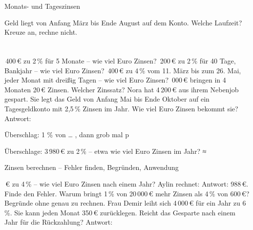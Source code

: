 \begin{aufgabe}{Monats- und Tageszinsen}
\begin{teile}
\teil Geld liegt von Anfang März bis Ende August auf dem Konto. Welche Laufzeit? Kreuze an, rechne nicht. \\  \\  \\ 
\,400\,€ zu 2\,\% für 5 Monate – wie viel Euro Zinsen? \leerfeld[€]
\,200\,€ zu 2\,\% für 40 Tage, Bankjahr – wie viel Euro Zinsen? \leerfeld[€]
\,400\,€ zu 4\,\% vom 11. März bis zum 26. Mai, jeder Monat mit dreißig Tagen – wie viel Euro Zinsen? \leerfeld[€]
\,000\,€ bringen in 4 Monaten 20\,€ Zinsen. Welcher Zinssatz? \leerfeld[\%]
\teil Nora hat 4\,200\,€ aus ihrem Nebenjob gespart. Sie legt das Geld von Anfang Mai bis Ende Oktober auf ein Tagesgeldkonto mit 2,5\,\% Zinsen im Jahr. Wie viel Euro Zinsen bekommt sie? Antwort: \leerfeld
\end{teile}
\end{aufgabe}

\begin{aufgabe}{Überschlag: 1 \% von … , dann grob mal p}
\begin{teile}
\teil Überschlage: 3\,980\,€ zu 2\,\% – etwa wie viel Euro Zinsen im Jahr? ≈ \leerfeld[€]
\end{teile}
\end{aufgabe}

\begin{aufgabe}{Zinsen berechnen – Fehler finden, Begründen, Anwendung}
\begin{teile}
\,€ zu 4\,\% – wie viel Euro Zinsen nach einem Jahr? Aylin rechnet:  Antwort: 988\,€. Finde den Fehler.
\teil Warum bringt 1\,\% von 20\,000\,€ mehr Zinsen als 4\,\% von 600\,€? Begründe ohne genau zu rechnen.
\teil Frau Demir leiht sich 4\,000\,€ für ein Jahr zu 6\,\%. Sie kann jeden Monat 350\,€ zurücklegen. Reicht das Gesparte nach einem Jahr für die Rückzahlung? Antwort: \leerfeld
\end{teile}
\end{aufgabe}
